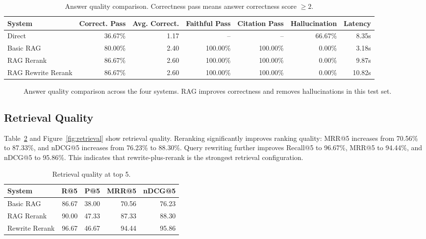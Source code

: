 \begin{table}[t]
\centering
\caption{Answer quality comparison. Correctness pass means answer correctness score $\geq 2$.}
\label{tab:answer_quality}
\begin{tabular}{lrrrrrr}
\toprule
System & Correct. Pass & Avg. Correct. & Faithful Pass & Citation Pass & Hallucination & Latency \\
\midrule
Direct & 36.67\% & 1.17 & -- & -- & 66.67\% & 8.35s \\
Basic RAG & 80.00\% & 2.40 & 100.00\% & 100.00\% & 0.00\% & 3.18s \\
RAG Rerank & 86.67\% & 2.60 & 100.00\% & 100.00\% & 0.00\% & 9.87s \\
RAG Rewrite Rerank & 86.67\% & 2.60 & 100.00\% & 100.00\% & 0.00\% & 10.82s \\
\bottomrule
\end{tabular}
\end{table}

\begin{figure}[t]
\centering
{}
\caption{Answer quality comparison across the four systems. RAG improves correctness and removes hallucinations in this test set.}
\label{fig:quality}
\end{figure}

\subsection{Retrieval Quality}

Table~\ref{tab:retrieval} and Figure~\ref{fig:retrieval} show retrieval quality. Reranking significantly improves ranking quality: MRR@5 increases from 70.56\% to 87.33\%, and nDCG@5 increases from 76.23\% to 88.30\%. Query rewriting further improves Recall@5 to 96.67\%, MRR@5 to 94.44\%, and nDCG@5 to 95.86\%. This indicates that rewrite-plus-rerank is the strongest retrieval configuration.

\begin{table}[t]
\centering
\caption{Retrieval quality at top 5.}
\label{tab:retrieval}
\begin{tabular}{lrrrr}
\toprule
System & R@5 & P@5 & MRR@5 & nDCG@5 \\
\midrule
Basic RAG & 86.67 & 38.00 & 70.56 & 76.23 \\
RAG Rerank & 90.00 & 47.33 & 87.33 & 88.30 \\
Rewrite Rerank & 96.67 & 46.67 & 94.44 & 95.86 \\
\bottomrule
\end{tabular}
\end{table}


